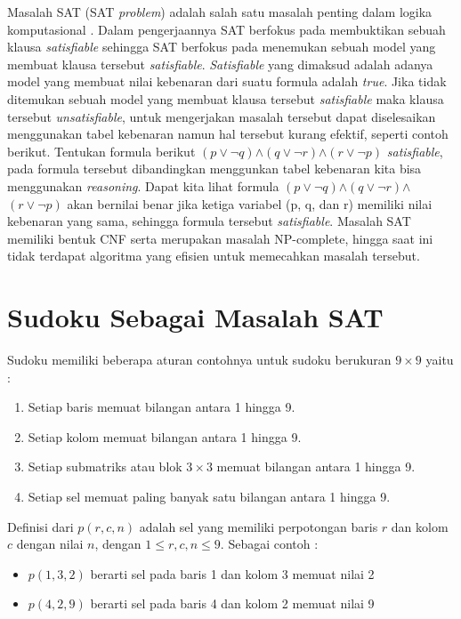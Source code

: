 Masalah SAT (SAT \textit{problem}) adalah salah satu masalah penting dalam logika komputasional \cite{huth2004logic}. Dalam pengerjaannya SAT berfokus pada membuktikan sebuah klausa \textit{satisfiable} sehingga SAT berfokus pada menemukan sebuah model yang membuat klausa tersebut \textit{satisfiable}. \textit{Satisfiable} yang dimaksud adalah adanya model yang membuat nilai kebenaran dari suatu formula adalah \textit{true}. Jika tidak ditemukan sebuah model yang membuat klausa tersebut \textit{satisfiable} maka klausa tersebut \textit{unsatisfiable}, untuk mengerjakan masalah tersebut dapat diselesaikan menggunakan tabel kebenaran namun hal tersebut kurang efektif, seperti contoh berikut. Tentukan formula berikut $\left(p\vee\neg q\right)$$\wedge$$\left(q\vee\neg r\right)$$\wedge$$\left(r\vee\neg p\right)$ \textit{satisfiable}, pada formula tersebut dibandingkan menggunkan tabel kebenaran kita bisa menggunakan \textit{reasoning}. Dapat kita lihat formula $\left(p\vee\neg q\right)$$\wedge$$\left(q\vee\neg r\right)$$\wedge$$\left(r\vee\neg p\right)$ akan bernilai benar jika ketiga variabel (p, q, dan r) memiliki nilai kebenaran yang sama, sehingga formula tersebut \textit{satisfiable}. Masalah SAT memiliki bentuk CNF serta merupakan masalah NP-complete, hingga saat ini tidak
terdapat algoritma yang efisien untuk memecahkan masalah tersebut. 



\section{Sudoku Sebagai Masalah SAT}
Sudoku memiliki beberapa aturan contohnya untuk sudoku berukuran  $9 \times 9$ yaitu :

\begin{enumerate}
	\item Setiap baris memuat bilangan antara 1 hingga 9.
	\item Setiap kolom memuat bilangan antara 1 hingga 9.
	\item Setiap submatriks atau blok $3 \times 3$
	 memuat bilangan antara 1 hingga 9.
	\item Setiap sel memuat paling banyak satu bilangan antara 1 hingga 9.
\end{enumerate}

Definisi dari $p\left(r,c,n\right)$ adalah sel yang memiliki perpotongan baris $r$ dan kolom $c$ dengan nilai $n$, dengan $1 \leq r,c,n \leq 9$. Sebagai contoh :

\begin{itemize}
	\item $p\left(1,3,2\right)$ berarti sel pada baris 1 dan kolom 3 memuat nilai 2
	\item $p\left(4,2,9\right)$ berarti sel pada baris 4 dan kolom 2 memuat nilai 9
\end{itemize}

